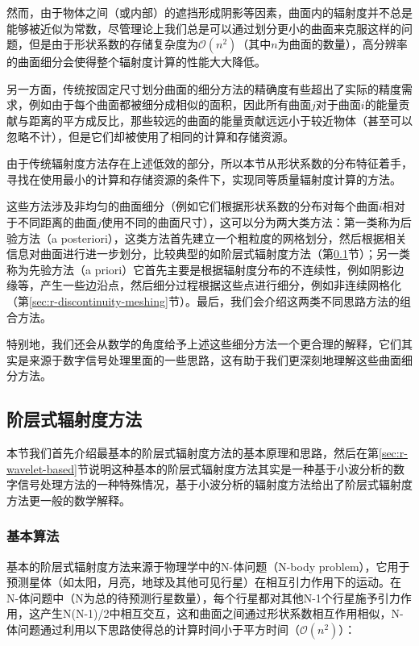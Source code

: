 然而，由于物体之间（或内部）的遮挡形成阴影等因素，曲面内的辐射度并不总是能够被近似为常数，尽管理论上我们总是可以通过划分更小的曲面来克服这样的问题，但是由于形状系数的存储复杂度为$\mathcal{O}(n^{2})$（其中$n$为曲面的数量），高分辨率的曲面细分会使得整个辐射度计算的性能大大降低。

另一方面，传统按固定尺寸划分曲面的细分方法的精确度有些超出了实际的精度需求，例如由于每个曲面都被细分成相似的面积，因此所有曲面$j$对于曲面$i$的能量贡献与距离的平方成反比，那些较远的曲面的能量贡献远远小于较近物体（甚至可以忽略不计），但是它们却被使用了相同的计算和存储资源。

由于传统辐射度方法存在上述低效的部分，所以本节从形状系数的分布特征着手，寻找在使用最小的计算和存储资源的条件下，实现同等质量辐射度计算的方法。

这些方法涉及非均匀的曲面细分（例如它们根据形状系数的分布对每个曲面$i$相对于不同距离的曲面$j$使用不同的曲面尺寸），这可以分为两大类方法：第一类称为后验方法（a posteriori），这类方法首先建立一个粗粒度的网格划分，然后根据相关信息对曲面进行进一步划分，比较典型的如阶层式辐射度方法（第\ref{sec:r-hierarchical-radiosity}节）；另一类称为先验方法（a priori）它首先主要是根据辐射度分布的不连续性，例如阴影边缘等，产生一些边沿点，然后细分过程根据这些点进行细分，例如非连续网格化（第\ref{sec:r-discontinuity-meshing}节）。最后，我们会介绍这两类不同思路方法的组合方法。

特别地，我们还会从数学的角度给予上述这些细分方法一个更合理的解释，它们其实是来源于数字信号处理里面的一些思路，这有助于我们更深刻地理解这些曲面细分方法。




\subsection{阶层式辐射度方法}\label{sec:r-hierarchical-radiosity}
本节我们首先介绍最基本的阶层式辐射度方法的基本原理和思路，然后在第\ref{sec:r-wavelet-based}节说明这种基本的阶层式辐射度方法其实是一种基于小波分析的数字信号处理方法的一种特殊情况，基于小波分析的辐射度方法给出了阶层式辐射度方法更一般的数学解释。




\subsubsection{基本算法}
基本的阶层式辐射度方法来源于物理学中的N-体问题（N-body problem）\cite{a:AnEfficientProgramforManyBodySimulation}，它用于预测星体（如太阳，月亮，地球及其他可见行星）在相互引力作用下的运动。在N-体问题中（N为总的待预测行星数量），每个行星都对其他N-1个行星施予引力作用，这产生N(N-1)/2中相互交互，这和曲面之间通过形状系数相互作用相似，N-体问题通过利用以下思路使得总的计算时间小于平方时间（$\mathcal{O}(n^{2})$）：

